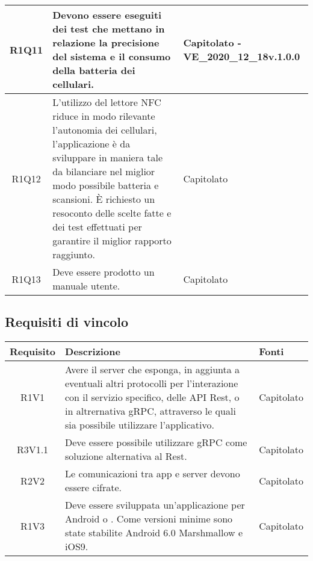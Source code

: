 \begin{center}
\begin{longtable}{|c|p{10cm}|p{4cm}|}
		R1Q11&Devono essere eseguiti dei test che mettano in relazione la precisione del sistema e il consumo della batteria dei cellulari.	& Capitolato - VE\_2020\_12\_18v.1.0.0	\\
		\hline
		R1Q12&L’utilizzo del lettore NFC riduce in modo rilevante l’autonomia dei cellulari, l’applicazione è da sviluppare in maniera tale da bilanciare nel miglior modo possibile batteria e scansioni. È richiesto un resoconto delle scelte fatte e dei test effettuati per garantire il miglior rapporto raggiunto.	& Capitolato	\\
		\hline
		R1Q13& Deve essere prodotto un manuale utente.	& Capitolato	\\
		\hline
		
	\end{longtable}
\end{center}
\subsection{Requisiti di vincolo}
\begin{center}
	\begin{longtable}{|c|p{10cm}|p{4cm}|}
		\hline
		\rowcolor{lighter-grayer}
		\textbf{Requisito} & \textbf{Descrizione} & \textbf{Fonti}  \\
		\hline
		\endhead
		
		
		R1V1 &Avere il server che esponga, in aggiunta a eventuali altri protocolli per l’interazione con il servizio specifico, delle API Rest, o in altrernativa gRPC, attraverso le quali sia possibile utilizzare l’applicativo. & Capitolato \\
		\hline
		R3V1.1&Deve essere possibile utilizzare gRPC come soluzione alternativa al Rest. & Capitolato \\
		\hline
		
		R2V2&Le comunicazioni tra app e server devono essere cifrate.	& Capitolato	\\
		
		\hline
		R1V3&Deve essere sviluppata un'applicazione per Android o \glock{iOS}. Come versioni minime sono state stabilite Android 6.0 Marshmallow e iOS9.	& Capitolato	\\
		\hline
		
		
	\end{longtable}
\end{center}

